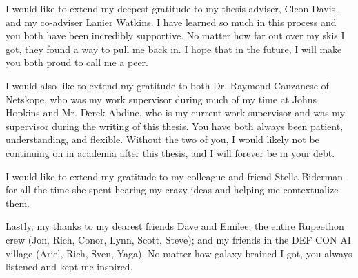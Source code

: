 
I would like to extend my deepest gratitude to my thesis adviser, Cleon Davis, and my co-adviser Lanier Watkins.
I have learned so much in this process and you both have been incredibly supportive. 
No matter how far out over my skis I got, they found a way to pull me back in.
I hope that in the future, I will make you both proud to call me a peer.

I would also like to extend my gratitude to both Dr. Raymond Canzanese of Netskope, who was my work supervisor during much of my time at Johns Hopkins and Mr. Derek Abdine, who is my current work supervisor and was my supervisor during the writing of this thesis.
You have both always been patient, understanding, and flexible.
Without the two of you, I would likely not be continuing on in academia after this thesis, and I will forever be in your debt.

I would like to extend my gratitude to my colleague and friend Stella Biderman for all the time she spent hearing my crazy ideas and helping me contextualize them.

Lastly, my thanks to my dearest friends Dave and Emilee; the entire Rupeethon crew (Jon, Rich, Conor, Lynn, Scott, Steve); and my friends in the DEF CON AI village (Ariel, Rich, Sven, Yaga). 
No matter how galaxy-brained I got, you always listened and kept me inspired.